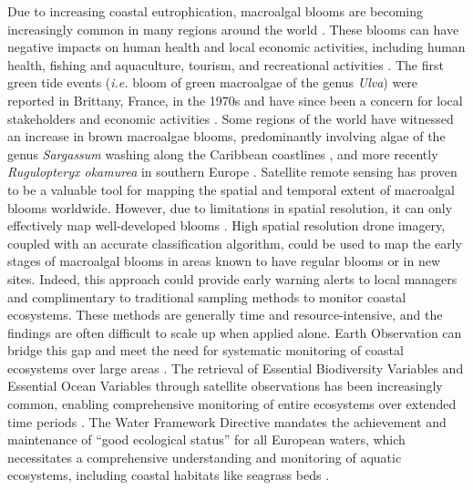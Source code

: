 \documentclass[
  number]{elsarticle}
\begin{document}
Due to increasing coastal eutrophication, macroalgal blooms are becoming
increasingly common in many regions around the world
\citep{sutton2011european, ye2011green}. These blooms can have negative
impacts on human health and local economic activities, including human
health, fishing and aquaculture, tourism, and recreational activities
\citep{villares1999nitrogen, ye2011green}. The first green tide events
(\emph{i.e.} bloom of green macroalgae of the genus \emph{Ulva}) were
reported in Brittany, France, in the 1970s and have since been a concern
for local stakeholders and economic activities
\citep{menesguen2018marees}. Some regions of the world have witnessed an
increase in brown macroalgae blooms, predominantly involving algae of
the genus \emph{Sargassum} washing along the Caribbean coastlines
\citep{louime2017sargassum}, and more recently \emph{Rugulopteryx
okamurea} in southern Europe \citep{Roca2022}. Satellite remote sensing
has proven to be a valuable tool for mapping the spatial and temporal
extent of macroalgal blooms worldwide. However, due to limitations in
spatial resolution, it can only effectively map well-developed blooms
\citep{rs13081408, klemas2012remote, haro2023biointertidal}. High
spatial resolution drone imagery, coupled with an accurate
classification algorithm, could be used to map the early stages of
macroalgal blooms in areas known to have regular blooms or in new sites.
Indeed, this approach could provide early warning alerts to local
managers and complimentary to traditional sampling methods to monitor
coastal ecosystems. These methods are generally time and
resource-intensive, and the findings are often difficult to scale up
when applied alone. Earth Observation can bridge this gap and meet the
need for systematic monitoring of coastal ecosystems over large areas
\citep{papathanasopoulou2019satellite}. The retrieval of Essential
Biodiversity Variables and Essential Ocean Variables through satellite
observations has been increasingly common, enabling comprehensive
monitoring of entire ecosystems over extended time periods
\citep{ratnarajah2023monitoring, Zoffoli2021}. The Water Framework
Directive \citep{WFD2000} mandates the achievement and maintenance of
``good ecological status'' for all European waters, which necessitates a
comprehensive understanding and monitoring of aquatic ecosystems,
including coastal habitats like seagrass beds
\citep{foden2007angiosperms, nordlund2024one, Zoffoli2021}.
\end{document}
